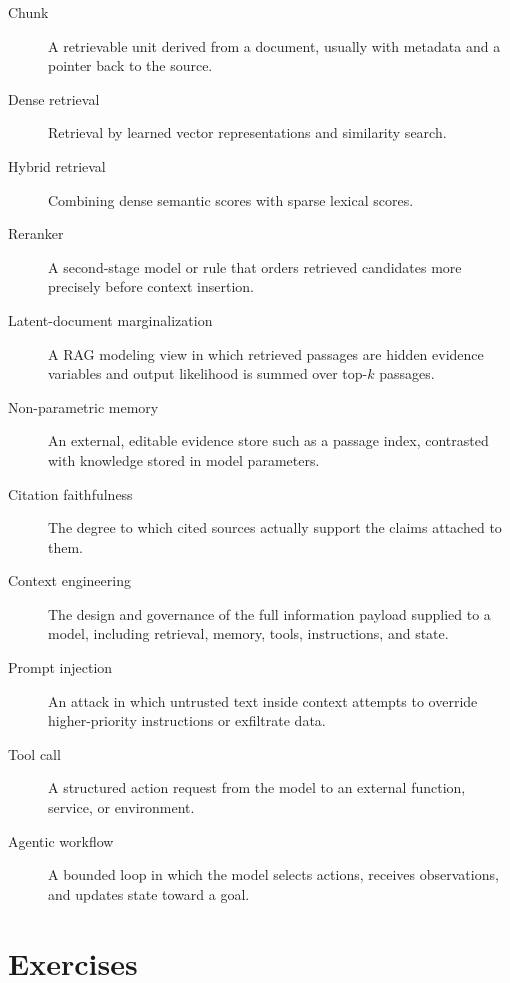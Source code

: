 \begin{description}
\item[Chunk] A retrievable unit derived from a document, usually with metadata and a pointer back to the source.
\item[Dense retrieval] Retrieval by learned vector representations and similarity search.
\item[Hybrid retrieval] Combining dense semantic scores with sparse lexical scores.
\item[Reranker] A second-stage model or rule that orders retrieved candidates more precisely before context insertion.
\item[Latent-document marginalization] A RAG modeling view in which retrieved passages are hidden evidence variables and output likelihood is summed over top-$k$ passages.
\item[Non-parametric memory] An external, editable evidence store such as a passage index, contrasted with knowledge stored in model parameters.
\item[Citation faithfulness] The degree to which cited sources actually support the claims attached to them.
\item[Context engineering] The design and governance of the full information payload supplied to a model, including retrieval, memory, tools, instructions, and state.
\item[Prompt injection] An attack in which untrusted text inside context attempts to override higher-priority instructions or exfiltrate data.
\item[Tool call] A structured action request from the model to an external function, service, or environment.
\item[Agentic workflow] A bounded loop in which the model selects actions, receives observations, and updates state toward a goal.
\end{description}

\section{Exercises}
\label{sec:rag-exercises}

